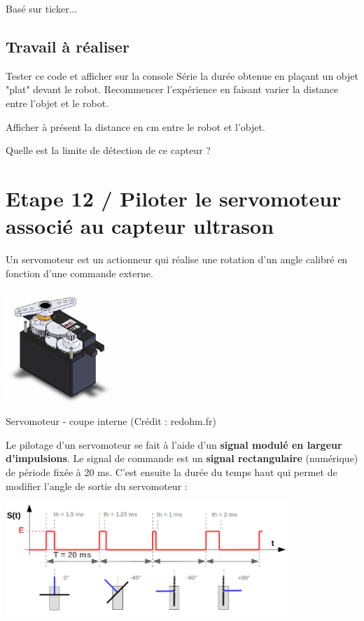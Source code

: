 \documentclass[a4paper,11pt,titlepage]{article} %
\begin{document}
 Basé sur ticker...



\subsection{Travail à réaliser}

\Manip Tester ce code et afficher sur la console Série la durée obtenue en  plaçant un objet "plat" devant le robot. Recommencer l'expérience en faisant varier la distance entre l'objet et le robot.

\Manip Afficher à présent la distance en cm entre le robot et l'objet. 

\Quest Quelle est la limite de détection de ce capteur ?

\newpage
\section{Etape 12 / Piloter le servomoteur associé au capteur ultrason}

Un servomoteur est un actionneur qui réalise une rotation d'un angle calibré en fonction d'une commande externe.

\begin{center}
	\includegraphics[width=0.3\textwidth]{images/MINE_Nucleo_servomoteur-redohm.jpg}
	
	Servomoteur - coupe interne (Crédit : redohm.fr)
\end{center}

Le pilotage d'un servomoteur se fait à l'aide d'un \textbf{signal modulé en largeur d'impulsions}. Le signal de commande est un \textbf{signal rectangulaire} (numérique) de période fixée à 20 ms. C'est ensuite la durée du temps haut qui permet de modifier l'angle de sortie du servomoteur :

\begin{center}
	\includegraphics[width=0.8\textwidth]{images/MINE_Nucleo_servomoteur.png}
\end{center}
\end{document}
